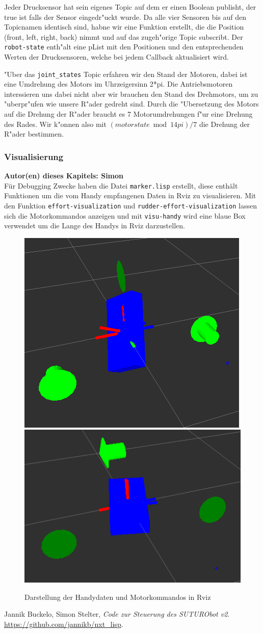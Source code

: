\documentclass[8pt]{article}
\newcommand{\secauthor}[1]{\textbf{Autor(en) dieses Kapitels: {#1}}\\}
\begin{document}
Jeder Drucksensor hat sein eigenes Topic auf dem er einen Boolean publisht, der true ist falls der Sensor eingedr"uckt wurde. Da alle vier Sensoren bis auf den Topicnamen identisch sind, habne wir eine Funktion erstellt, die die Position (front, left, right, back) nimmt und auf das zugeh"orige Topic subscribt. Der \texttt{robot-state} enth"alt eine pList mit den Positionen und den entsprechenden Werten der Drucksensoren, welche bei jedem Callback aktualisiert wird.

"Uber das \texttt{joint\_states} Topic erfahren wir den Stand der Motoren, dabei ist eine Umdrehung des Motors im Uhrzeigersinn 2*pi. Die Antriebsmotoren interssieren uns dabei nicht aber wir brauchen den Stand des Drehmotors, um zu "uberpr"ufen wie unsere R"ader gedreht sind. Durch die "Ubersetzung des Motors auf die Drehung der R"ader braucht es 7 Motorumdrehungen f"ur eine Drehung des Rades. Wir k"onnen also mit 
\( (motorstate \bmod 14pi) / 7 \) die Drehung der R"ader bestimmen.

\subsubsection{Visualisierung} 
\secauthor{Simon}
Für Debugging Zwecke haben die Datei \texttt{marker.lisp} erstellt, diese enthält Funktionen um die vom Handy empfangenen Daten in Rviz zu visualisieren. Mit den Funktion \texttt{effort-visualization} und \texttt{rudder-effort-visualization} lassen sich die Motorkommandos anzeigen und mit \texttt{visu-handy} wird eine blaue Box verwendet um die Lange des Handys in Rviz darzustellen.
\begin{figure}[h]
  \begin{center}
    \includegraphics[width=.4\textwidth]{pictures/rviz2.png}
    \includegraphics[width=.5\textwidth]{pictures/rviz1.png}    
  \end{center}
  \caption{Darstellung der Handydaten und Motorkommandos in Rviz}
  \label{fig:pancake}
\end{figure}

\begin{thebibliography}{9}

  Jannik Buckelo, Simon Stelter,
  \emph{Code zur Steuerung des SUTURObot v2}.
  \url{https://github.com/jannikb/nxt\_lisp}.

\end{thebibliography}
\end{document}
